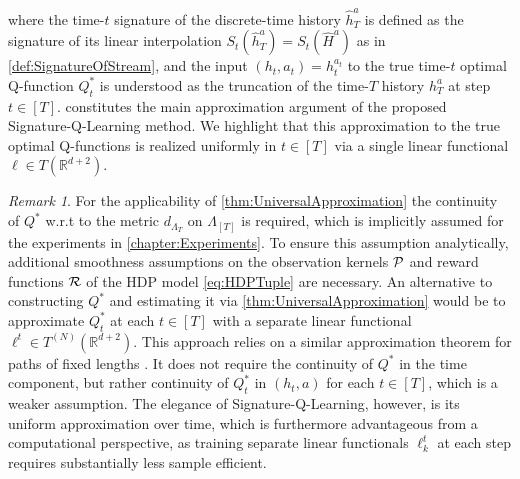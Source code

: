 \documentclass[
    a4paper,
    11pt,
    bibliography=totoc,
    listof=totoc,      
    headinclude=true,
    cleardoublepage=empty,
]{scrbook}
\theoremstyle{plain}
\theoremstyle{definition}
\theoremstyle{remark}
\newtheorem{remark}[theorem]{Remark}
\newcommand{\SetR}{\mathbb R}
\newcommand{\KernelP}{{\cal P}}
\newcommand{\KernelR}{{\cal R}}
\begin{document}
where the time-$t$ signature of the discrete-time history $\hat h^a_T$ is 
defined as the signature of its linear interpolation $S_t(\hat h^{a}_T) = 
S_t(\hat H^a)$ as in \cref{def:SignatureOfStream}, and the input $( 
h_t,a_t) = h^{a_t}_{t}$ to the true time-$t$ optimal Q-function $Q_t^*$ 
is understood as the truncation of the time-$T$ history $h^{a}_T$ at step 
$t\in[T]$.  constitutes the main approximation 
argument of the proposed Signature-Q-Learning method. We highlight that this 
approximation to the true optimal Q-functions is realized uniformly in $t\in[T]$ via a single linear 
functional $\ell\in T(\SetR^{d+2})$.

\begin{remark}
    For the applicability of \cref{thm:UniversalApproximation} the continuity 
    of $Q^*$ w.r.t to the metric $d_{\Lambda_{T}}$ on $\Lambda_{[T]}$ is 
    required, which is implicitly assumed for the experiments in 
    \cref{chapter:Experiments}. To ensure this assumption analytically, 
    additional smoothness assumptions on the observation kernels $\KernelP$ 
    and reward functions $\KernelR$ of the HDP model \eqref{eq:HDPTuple} are 
    necessary. An alternative to constructing $Q^*$ and estimating it via 
    \cref{thm:UniversalApproximation} would be to approximate $Q^*_t$ at each 
    $t\in[T]$ with a separate linear functional $\ell^t \in T^{(N)}
    (\SetR^{d+2})$. This approach relies on a similar approximation theorem 
    for paths of fixed lengths \cite[Theorem~1]{kiraly2019_ksod}. It does not 
    require the continuity of $Q^*$ in the time component, but rather 
    continuity of $Q^*_t$ in $(h_t,a)$ for each $t\in[T]$, which is a weaker assumption. The elegance of Signature-Q-Learning, however, is its uniform approximation over time, which is furthermore advantageous from a computational perspective, as training separate linear functionals $\ell_k^t$ at each step requires substantially less sample efficient.    
\end{remark}
\end{document}
